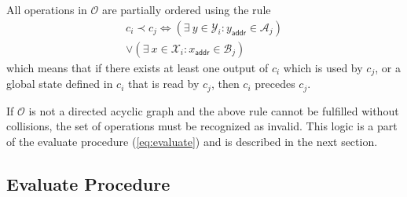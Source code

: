 \documentclass[9pt,oneside]{amsart}
\begin{document}
\begin{multicols}{2}
All operations in $\mathcal{O}$ are partially ordered using the rule
\noindent
\begin{equation}
\begin{split}
c_i \prec c_j \Longleftrightarrow (\exists \ y \in \mathcal{Y}_i: y_\mathsf{addr} \in \mathcal{A}_j) \\
\vee (\exists \ x \in \mathcal{X}_i: x_\mathsf{addr} \in \mathcal{B}_j)
\end{split}
\end{equation}
\noindent
which means that if there exists at least one output of $c_i$ which is used by $c_j$, or a global
state defined in $c_i$ that is read by $c_j$, then $c_i$ precedes $c_j$.

If $\mathcal{O}$ is not a directed acyclic graph and the above rule cannot be fulfilled without
collisions, the set of operations must be recognized as invalid.
This logic is a part of the \textsf{evaluate} procedure (\ref{eq:evaluate})
and is described in the next section.


\subsection{Evaluate Procedure}\label{Evaluate}


\end{multicols}
\end{document}
